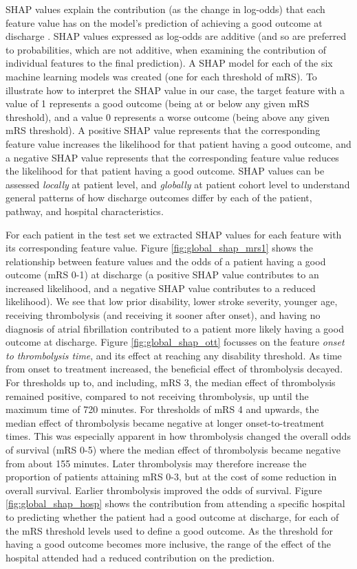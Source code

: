 SHAP values explain the contribution (as the change in log-odds) that each feature value has on the model’s prediction of achieving a good outcome at discharge \cite{lundberg_unified_2017}. SHAP values expressed as log-odds are additive (and so are preferred to probabilities, which are not additive, when examining the contribution of individual features to the final prediction). A SHAP model for each of the six machine learning models was created (one for each threshold of mRS). To illustrate how to interpret the SHAP value in our case, the target feature with a value of 1 represents a good outcome (being at or below any given mRS threshold), and a value 0 represents a worse outcome (being above any given mRS threshold). A positive SHAP value represents that the corresponding feature value increases the likelihood for that patient having a good outcome, and a negative SHAP value represents that the corresponding feature value reduces the likelihood for that patient having a good outcome. SHAP values can be assessed \textit{locally} at patient level, and \textit{globally} at patient cohort level to understand general patterns of how discharge outcomes differ by each of the patient, pathway, and hospital characteristics.

For each patient in the test set we extracted SHAP values for each feature with its corresponding feature value. Figure \ref{fig:global_shap_mrs1} shows the relationship between feature values and the odds of a patient having a good outcome (mRS 0-1) at discharge (a positive SHAP value contributes to an increased likelihood, and a negative SHAP value contributes to a reduced likelihood). We see that low prior disability, lower stroke severity, younger age, receiving thrombolysis (and receiving it sooner after onset), and having no diagnosis of atrial fibrillation contributed to a patient more likely having a good outcome at discharge. Figure \ref{fig:global_shap_ott} focusses on the feature \textit{onset to thrombolysis time}, and its effect at reaching any disability threshold. As time from onset to treatment increased, the beneficial effect of thrombolysis decayed. For thresholds up to, and including, mRS 3, the median effect of thrombolysis remained positive, compared to not receiving thrombolysis, up until the maximum time of 720 minutes. For thresholds of mRS 4 and upwards, the median effect of thrombolysis became negative at longer onset-to-treatment times. This was especially apparent in how thrombolysis changed the overall odds of survival (mRS 0-5) where the median effect of thrombolysis became negative from about 155 minutes. Later thrombolysis may therefore increase the proportion of patients attaining mRS 0-3, but at the cost of some reduction in overall survival. Earlier thrombolysis improved the odds of survival. Figure \ref{fig:global_shap_hosp} shows the contribution from attending a specific hospital to predicting whether the patient had a good outcome at discharge, for each of the mRS threshold levels used to define a good outcome. As the threshold for having a good outcome becomes more inclusive, the range of the effect of the hospital attended had a reduced contribution on the prediction.



